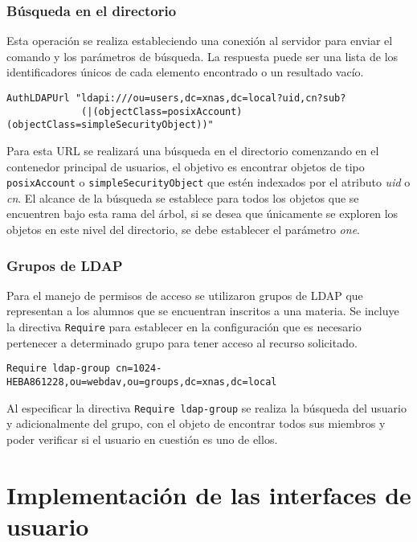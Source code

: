         \subsubsection {B\'{u}squeda en el directorio}

Esta operaci\'{o}n se realiza estableciendo una conexi\'{o}n al servidor para enviar el comando y los par\'{a}metros de b\'{u}squeda. La respuesta puede ser una lista de los identificadores \'{u}nicos de cada elemento encontrado o un resultado vac\'{i}o.

{
\footnotesize
\linespread{1}
\begin{verbatim}
AuthLDAPUrl "ldapi:///ou=users,dc=xnas,dc=local?uid,cn?sub?
             (|(objectClass=posixAccount)(objectClass=simpleSecurityObject))"
\end{verbatim}
}


Para esta URL se realizar\'{a} una b\'{u}squeda en el directorio comenzando en el contenedor principal de usuarios, el objetivo es encontrar objetos de tipo \texttt{posixAccount} o \texttt{simpleSecurityObject} que est\'{e}n indexados por el atributo \textsl{uid} o \textsl{cn}. El alcance de la b\'{u}squeda se establece para todos los objetos que se encuentren bajo esta rama del \'{a}rbol, si se desea que \'{u}nicamente se exploren los objetos en este nivel del directorio, se debe establecer el par\'{a}metro \textsl{one}.

        \subsubsection {Grupos de \textsc{LDAP}}

Para el manejo de permisos de acceso se utilizaron grupos de \textsc{LDAP} que representan a los alumnos que se encuentran inscritos a una materia. Se incluye la directiva \texttt{Require} para establecer en la configuraci\'{o}n que es necesario pertenecer a determinado grupo para tener acceso al recurso solicitado.

{
\footnotesize
\linespread{1}
\begin{verbatim}
Require ldap-group cn=1024-HEBA861228,ou=webdav,ou=groups,dc=xnas,dc=local
\end{verbatim}
}

Al especificar la directiva \texttt{Require ldap-group} se realiza la b\'{u}squeda del usuario y adicionalmente del grupo, con el objeto de encontrar todos sus miembros y poder verificar si el usuario en cuesti\'{o}n es uno de ellos.


    \section {Implementaci\'{o}n de las interfaces de usuario}

